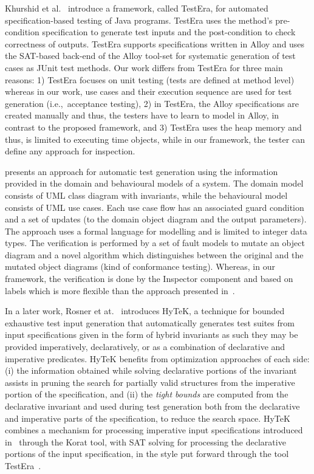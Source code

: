 Khurshid et al.~\cite{Khurshid2004} introduce a framework, called TestEra, for automated specification-based testing of Java programs. TestEra uses the method's pre-condition specification to generate test inputs and the post-condition to check correctness of outputs. TestEra supports specifications written in Alloy and uses the SAT-based back-end of the Alloy tool-set for systematic generation of test cases as JUnit test methods. Our work differs from TestEra for three main reasons: 1) TestEra focuses on unit testing (tests are defined at method level) whereas in our work, use cases and their execution sequence are used for test generation (i.e.,\ acceptance testing), 2) in TestEra, the Alloy specifications are created manually and thus, the testers have to learn to model in Alloy, in contrast to the proposed framework, and 3) TestEra uses the heap memory and thus, is limited to executing time objects, while in our framework, the tester can define any approach for inspection.

\cite{Kaplan2008} presents an approach for automatic test generation using the information provided in the domain and behavioural models of a system. The domain model consists of UML class diagram with invariants, while the behavioural model consists of UML use cases. Each use case flow has an associated guard condition and a set of updates (to the domain object diagram and the output parameters). The approach uses a formal language for modelling and is limited to integer data types. The verification is performed by a set of fault models to mutate an object diagram and a novel algorithm which distinguishes between the original and the mutated object diagrams (kind of conformance testing). Whereas, in our framework, the verification is done by the Inspector component and based on labels which is more flexible than the approach presented in~\cite{Kaplan2008}.

In a later work, Rosner et at.~\cite{Rosner2014} introduces \textsf{HyTeK}, a technique for bounded exhaustive test input generation that automatically generates test suites from input
specifications given in the form of hybrid invariants as such they  may be provided imperatively, declaratively, or as a combination of declarative and imperative predicates. \textsf{HyTeK} benefits  from optimization approaches of each side: (i) the information obtained while solving declarative portions of the invariant assists in pruning the search for partially valid structures from the imperative portion of the specification, and (ii) the \textit{tight bounds} are computed from the declarative invariant and used   during test generation both from the declarative and imperative parts of the specification, to reduce the search space. \textsf{HyTeK} combines a mechanism for processing imperative input specifications introduced in~\cite{Boyapati2002} through the Korat tool, with SAT solving for processing the declarative portions of the input specification, in the style put forward through the tool TestEra~\cite{Khurshid2004}.

